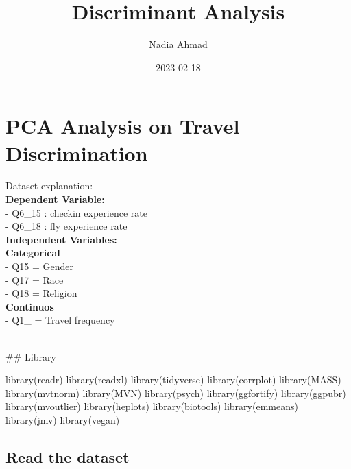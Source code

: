 \documentclass[
]{article}
\title{Discriminant Analysis}
\author{Nadia Ahmad}
\date{2023-02-18}
\newenvironment{Shaded}{\begin{snugshade}}{\end{snugshade}}
\newcommand{\FunctionTok}[1]{\textcolor[rgb]{0.00,0.00,0.00}{#1}}
\newcommand{\NormalTok}[1]{#1}
\begin{document}
\maketitle

\hypertarget{pca-analysis-on-travel-discrimination}{%
\section{PCA Analysis on Travel
Discrimination}\label{pca-analysis-on-travel-discrimination}}

\hfill\break
Dataset explanation:\\
\textbf{Dependent Variable:}\\
- Q6\_15 : checkin experience rate\\
- Q6\_18 : fly experience rate\\
\textbf{Independent Variables:}\\
\textbf{Categorical}\\
- Q15 = Gender\\
- Q17 = Race\\
- Q18 = Religion\\
\textbf{Continuos}\\
- Q1\_ = Travel frequency\\
\strut \\
\#\# Library

\begin{Shaded}
\begin{Highlighting}[]
\FunctionTok{library}\NormalTok{(readr)}
\FunctionTok{library}\NormalTok{(readxl)}
\FunctionTok{library}\NormalTok{(tidyverse)}
\FunctionTok{library}\NormalTok{(corrplot)}
\FunctionTok{library}\NormalTok{(MASS)}
\FunctionTok{library}\NormalTok{(mvtnorm)}
\FunctionTok{library}\NormalTok{(MVN)}
\FunctionTok{library}\NormalTok{(psych)}
\FunctionTok{library}\NormalTok{(ggfortify)}
\FunctionTok{library}\NormalTok{(ggpubr)}
\FunctionTok{library}\NormalTok{(mvoutlier)}
\FunctionTok{library}\NormalTok{(heplots)}
\FunctionTok{library}\NormalTok{(biotools)}
\FunctionTok{library}\NormalTok{(emmeans)}
\FunctionTok{library}\NormalTok{(jmv)}
\FunctionTok{library}\NormalTok{(vegan)}
\end{Highlighting}
\end{Shaded}

\hypertarget{read-the-dataset}{%
\subsection{Read the dataset}\label{read-the-dataset}}
\end{document}
